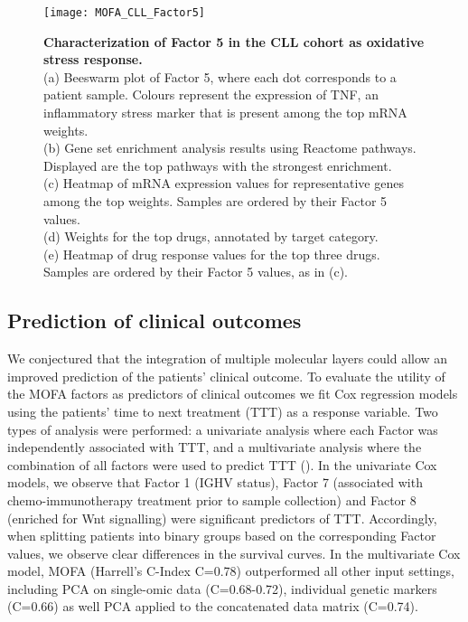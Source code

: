 \begin{figure}[H]
	\centering 	
	\texttt{[image: MOFA\_CLL\_Factor5]}
	\caption{
	\textbf{Characterization of Factor 5 in the CLL cohort as oxidative stress response.}\\
	(a) Beeswarm  plot of Factor 5, where each dot corresponds to a patient sample. Colours represent the expression of TNF, an inflammatory stress marker that is present among the top mRNA weights.\\
	(b) Gene set enrichment analysis results using Reactome pathways. Displayed are the top pathways with the strongest enrichment.\\
	(c) Heatmap of mRNA expression values for representative genes among the top weights. Samples are ordered by their Factor 5 values.\\
	(d) Weights for the top drugs, annotated by target category.\\
	(e) Heatmap of drug response values for the top three drugs. Samples are ordered by their Factor 5 values, as in (c).
	}
	\label{fig:MOFA_CLL_Factor5}
\end{figure}


\subsection{Prediction of clinical outcomes}

We conjectured that the integration of multiple molecular layers could allow an improved prediction of the patients' clinical outcome. To evaluate the utility of the MOFA factors as predictors of clinical outcomes we fit Cox regression models \cite{Cox1972} using the patients' time to next treatment (TTT) as a response variable. Two types of analysis were performed: a univariate analysis where each Factor was independently associated with TTT, and a multivariate analysis where the combination of all factors were used to predict TTT (). In the univariate Cox models, we observe  that Factor 1 (IGHV status), Factor 7 (associated with chemo-immunotherapy treatment prior to sample collection) and Factor 8 (enriched for Wnt signalling) were significant predictors of TTT. Accordingly, when splitting patients into binary groups based on the corresponding Factor values, we observe clear differences in the survival curves. In the multivariate Cox model, MOFA (Harrell's C-Index C=0.78) outperformed all other input settings, including PCA on single-omic data (C=0.68-0.72), individual genetic markers (C=0.66) as well PCA applied to the concatenated data matrix (C=0.74).

